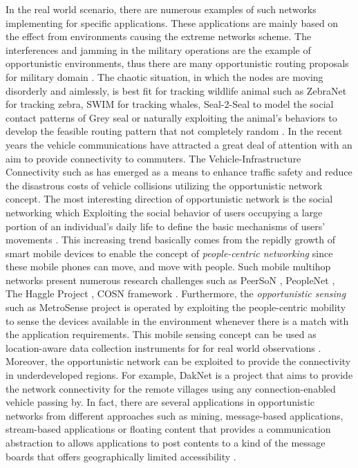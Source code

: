 In the real world scenario, there are numerous examples of such networks implementing for specific applications. 
These applications are mainly based on the effect from environments causing the extreme networks scheme.
The interferences and jamming in the military operations are the example of opportunistic environments, thus there are many opportunistic routing proposals for military domain \cite{Kerdsri2012a,Scott2005,Kidston2012,Haillot2009}.
The chaotic situation, in which the nodes are moving disorderly and aimlessly, is best fit for tracking wildlife animal such as ZebraNet \cite{zebranet2004} for tracking zebra, SWIM \cite{Small2003} for tracking whales, Seal-2-Seal \cite{Lindgren2008} to model the social contact patterns of Grey seal or naturally exploiting the animal’s behaviors to develop the feasible routing pattern that not completely random \cite{Yu2007a}.
In the recent years the vehicle communications have attracted a great deal of attention with an aim to provide connectivity to commuters.
The Vehicle-Infrastructure Connectivity such as \cite{Khabbaz2011,Morris2000,Singh2002,Kun-De2002,Briesemeister2000,Gavrilovich2001,Wang2010,Qi2011,DING201432,Kumar201422} has emerged as a means to enhance traffic safety and reduce the disastrous costs of vehicle collisions \cite{Khabbaz2012} utilizing the opportunistic network concept.
The most interesting direction of opportunistic network is the social networking which Exploiting the social behavior of users occupying a large portion of an individual’s daily life to define the basic mechanisms of users’ movements \cite{boldrini2008}.
%
This increasing trend basically comes from the repidly growth of smart mobile devices to enable the concept of \emph{people-centric networking} \cite{Conti2014} since these mobile phones can move, and move with people.
%
Such mobile multihop networks present numerous research challenges such as PeerSoN \cite{Sonja2009,PeerSoN}, PeopleNet \cite{Motani2005}, The Haggle Project \cite{Haggle,Papandrea2009}, COSN framework \cite{Garg2012}.
%
Furthermore, the \emph{opportunistic sensing} such as MetroSense project \cite{Campbell2008} is operated by exploiting the people-centric mobility to sense the devices available in the environment whenever there is a match with the application requirements. 
%
This mobile sensing concept can be used as location-aware data collection instruments for for real world observations \cite{Conti2014}.
%
Moreover, the opportunistic network can be exploited to provide the connectivity in underdeveloped regions.
%
For example, DakNet \cite{Pentland2004} is a project that aims to provide the network connectivity for the remote villages using any connection-enabled vehicle passing by.
In fact, there are several applications in opportunistic networks \cite{Kärkkäinen2013} from different approaches such as mining, message-based applications, stream-based applications or floating content that provides a communication abstraction to allows applications to post contents to a kind of the message boards that offers geographically limited accessibility \cite{Ott2011}.


